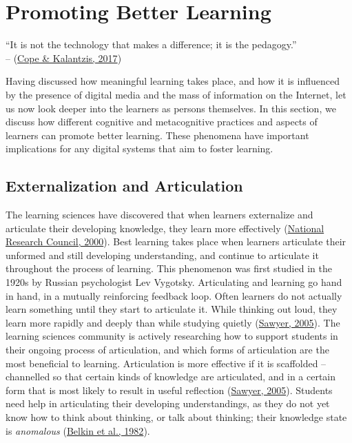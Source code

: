 \documentclass[a4paper, nobind]{templates/ociamthesis}
\begin{document}
\hypertarget{sec:bg_learn_promoting_learning}{%
\section{Promoting Better Learning}\label{sec:bg_learn_promoting_learning}}

``It is not the technology that makes a difference; it is the pedagogy.''
~\\
-- (\protect\hyperlink{ref-cope2017elearningc}{Cope \& Kalantzis, 2017})

Having discussed how meaningful learning takes place, and how it is
influenced by the presence of digital media and the mass of information
on the Internet, let us now look deeper into the learners as persons
themselves. In this section, we discuss how different cognitive and
metacognitive practices and aspects of learners can promote better
learning. These phenomena have important implications for any digital
systems that aim to foster learning.

\hypertarget{sec:bg_learn_articulation}{%
\subsection{Externalization and Articulation}\label{sec:bg_learn_articulation}}

The learning sciences have discovered that when learners externalize and
articulate their developing knowledge, they learn more effectively
(\protect\hyperlink{ref-council2000how}{National Research Council, 2000}). Best learning takes place when learners articulate
their unformed and still developing understanding, and continue to
articulate it throughout the process of learning. This phenomenon was
first studied in the 1920s by Russian psychologist Lev Vygotsky.
Articulating and learning go hand in hand, in a mutually reinforcing
feedback loop. Often learners do not actually learn something until they
start to articulate it. While thinking out loud, they learn more rapidly
and deeply than while studying quietly (\protect\hyperlink{ref-sawyer2005cambridge}{Sawyer, 2005}). The
learning sciences community is actively researching how to support
students in their ongoing process of articulation, and which forms of
articulation are the most beneficial to learning. Articulation is more
effective if it is scaffolded -- channelled so that certain kinds of
knowledge are articulated, and in a certain form that is most likely to
result in useful reflection (\protect\hyperlink{ref-sawyer2005cambridge}{Sawyer, 2005}). Students need help
in articulating their developing understandings, as they do not yet know
how to think about thinking, or talk about thinking; their knowledge
state is \emph{anomalous} (\protect\hyperlink{ref-belkin1982ask}{Belkin et al., 1982}).
\end{document}
